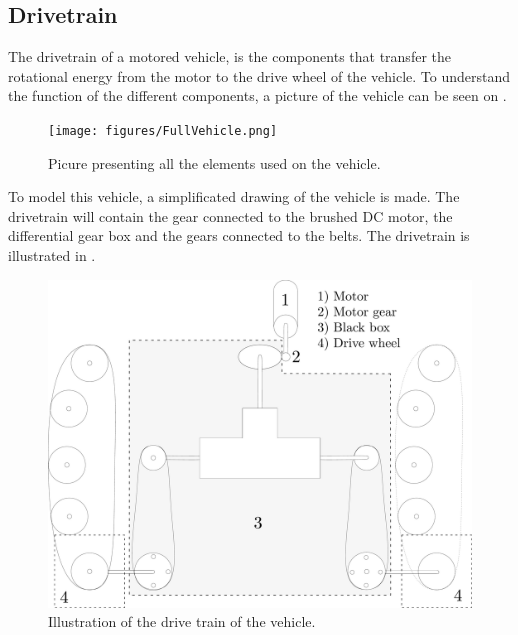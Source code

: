 \subsection{Drivetrain}
The drivetrain of a motored vehicle, is the components that transfer the rotational energy from the motor to the drive wheel of the vehicle. To understand the function of the different components, a picture of the vehicle can be seen on . 

\begin{figure}[H]
	\centering
	\texttt{[image: figures/FullVehicle.png]}
	\caption{Picure presenting all the elements used on the vehicle.}
	\label{FullVehicle}
\end{figure}

To model this vehicle, a simplificated drawing of the vehicle is made. The drivetrain will contain the gear connected to the brushed DC motor, the differential gear box and the gears connected to the belts. The drivetrain is illustrated in .

\begin{figure}[H]
	\centering
	\includegraphics[scale=.25]{figures/vehicleDescriptionDriveTrain.pdf}
	\caption{Illustration of the drive train of the vehicle.}
	\label{vehicleDescriptionDriveTrain}
\end{figure}

